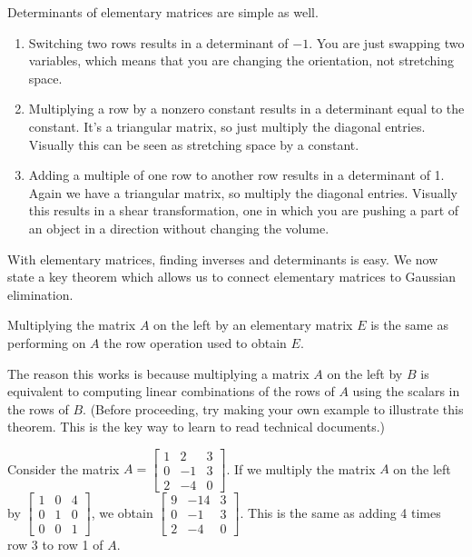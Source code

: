 Determinants of elementary matrices are simple as well. 
\begin{enumerate}
	\item Switching two rows results in a determinant of $-1$. You are just swapping two variables, which means that you are changing the orientation, not stretching space. 
	\item Multiplying a row by a nonzero constant results in a determinant equal to the constant. It's a triangular matrix, so just multiply the diagonal entries. Visually this can be seen as stretching space by a constant. 
	\item Adding a multiple of one row to another row results in a determinant of 1. Again we have a triangular matrix, so multiply the diagonal entries. Visually this results in a shear transformation, one in which you are pushing a part of an object in a direction without changing the volume. 
\end{enumerate}

With elementary matrices, finding inverses and determinants is easy.  We now state a key theorem which allows us to connect elementary matrices to Gaussian elimination.  

\begin{theorem}
Multiplying the matrix $A$ on the left by an elementary matrix $E$ is the same as performing on $A$ the row operation used to obtain $E$.
\end{theorem}
The reason this works is because multiplying a matrix $A$ on the left by $B$ is equivalent to computing linear combinations of the rows of $A$ using the scalars in the rows of $B$. 
(Before proceeding, try making your own example to illustrate this theorem. 
This is the key way to learn to read technical documents.)  

\begin{example}
Consider the matrix 
$A=\begin{bmatrix}
1&2&3\\
0&-1&3\\
2&-4&0
\end{bmatrix}$. 
If we multiply the matrix $A$ on the left by 
$\begin{bmatrix}
1&0&4\\
0&1&0\\
0&0&1
\end{bmatrix}$, 
we obtain 
$\begin{bmatrix}
9&-14&3\\
0&-1&3\\
2&-4&0\end{bmatrix}$. 
This is the same as adding 4 times row 3 to row 1 of $A$.  
\end{example}

